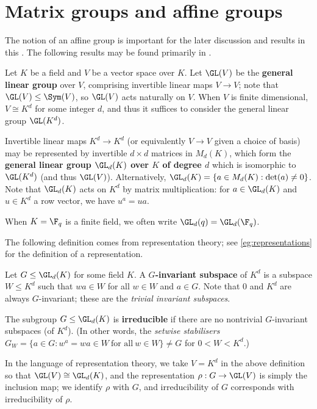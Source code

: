 \section{Matrix groups and affine groups}

The notion of an affine group is important for the later discussion and results in this \thesis{}. The following results may be found primarily in \cite{dixon_mortimer_perm_groups1996}.

\begin{definition}\label{def:gl_group}
    Let $K$ be a field and $V$ be a vector space over $K$. Let $\GL(V)$ be the \textbf{general linear group} over $V$, comprising invertible linear maps $V \to V$; note that $\GL(V) \leq \Sym(V)$, so $\GL(V)$ acts naturally on $V$. When $V$ is finite dimensional, $V \cong K^d$ for some integer $d$, and thus it suffices to consider the general linear group $\GL(K^d)$.

    Invertible linear maps $K^d \to K^d$ (or equivalently $V \to V$ given a choice of basis) may be represented by invertible $d \times d$ matrices in $M_d(K)$, which form the \textbf{general linear group $\GL_d(K)$ over $K$ of degree $d$} which is isomorphic to $\GL(K^d)$ (and thus $\GL(V)$). Alternatively, $\GL_d(K) = \{a \in M_d(K) : \det(a) \neq 0\}$. Note that $\GL_d(K)$ acts on $K^d$ by matrix multiplication: for $a \in \GL_d(K)$ and $u \in K^d$ a row vector, we have $u^a = ua$.

    When $K = \F_q$ is a finite field, we often write $\GL_d(q) = \GL_d(\F_q)$.
\end{definition}

The following definition comes from representation theory; see \autoref{eg:representations} for the definition of a representation.

\begin{definition}\label{def:irred_subgroup}
    Let $G \leq \GL_d(K)$ for some field $K$. A \textbf{$G$-invariant subspace} of $K^d$ is a subspace $W \leq K^d$ such that $wa \in W$ for all $w \in W$ and $a \in G$. Note that $0$ and $K^d$ are always $G$-invariant; these are the \textit{trivial invariant subspaces}.

    The subgroup $G \leq \GL_d(K)$ is \textbf{irreducible} if there are no nontrivial $G$-invariant subspaces (of $K^d$). (In other words, the \textit{setwise stabilisers} $G_W = \{a \in G : w^a = wa \in W\ \text{for all}\ w \in W\} \neq G$ for $0 < W < K^d$.)
\end{definition}

In the language of representation theory, we take $V = K^d$ in the above definition so that $\GL(V) \cong \GL_d(K)$, and the representation $\rho : G \to \GL(V)$ is simply the inclusion map; we identify $\rho$ with $G$, and irreducibility of $G$ corresponds with irreducibility of $\rho$.

